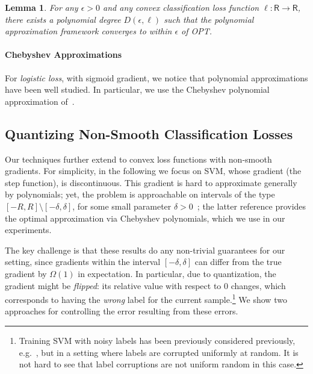 \documentclass{article}
\newcommand{\R}{\mathsf{R}}
\newtheorem{lemma}{Lemma}
\begin{document}
\begin{lemma}
	For any $\epsilon > 0$ and any convex classification loss function $\ell: \R \rightarrow \R$, there exists a polynomial degree $D(\epsilon, \ell)$ such that the polynomial approximation framework converges to within $\epsilon$ of OPT.  
\end{lemma}

\vspace{-0.5em}
\paragraph{Chebyshev Approximations} 
For \emph{logistic loss}, with sigmoid gradient, we notice that polynomial approximations have been well studied. In particular, we use the  Chebyshev polynomial approximation of~\cite{vlcek2012chebyshev}. 

\vspace{-0.5em}
\subsection{Quantizing Non-Smooth Classification Losses}
\vspace{-0.5em}

Our techniques further extend to convex loss functions with non-smooth gradients.  
For simplicity, in the following we focus on SVM, whose gradient (the step function), is discontinuous. 
This gradient is hard to approximate generally by polynomials; yet, the problem is approachable on intervals of the type  $[-R, R] \setminus [-\delta, \delta]$, for some small parameter $\delta > 0$~\cite{frostig2016principal, allen2016faster}; the latter reference provides the optimal approximation via Chebyshev polynomials, which we use in our experiments. 

The key challenge is that these results do any non-trivial guarantees for our setting, since gradients within the interval $[-\delta, \delta]$ can differ from the true gradient by $\Omega (1)$ in expectation. In particular, due to quantization, the gradient might be \emph{flipped}: 
its relative value with respect to $0$ changes, which corresponds to having the \emph{wrong} label for the current sample.\footnote{Training SVM with noisy labels has been previously considered previously, e.g.~\cite{Natarajan:2013:NIPS}, but in a setting where labels are corrupted uniformly at random. It is not hard to see that label corruptions are not uniform random in this case.}
We show two approaches for controlling the error resulting from these errors. 
\end{document}
